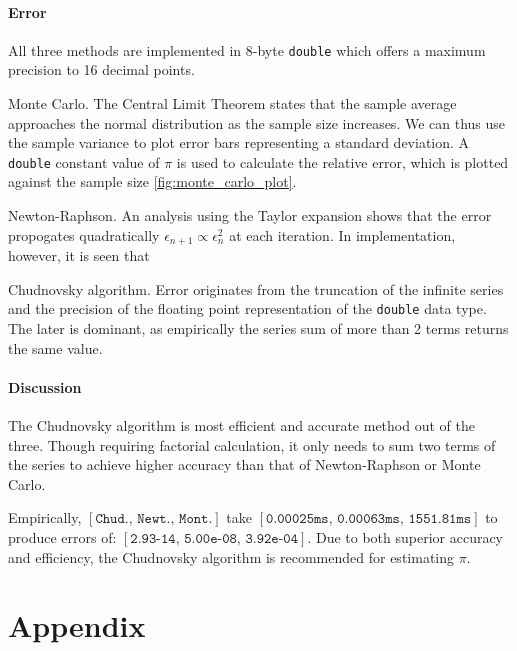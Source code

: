 \documentclass[11pt]{article}
\begin{document}
\paragraph{Error}
All three methods are implemented in 8-byte \texttt{double} which offers a maximum precision to
16 decimal points.
\par{Monte Carlo.} The Central Limit Theorem states that the sample average approaches the normal distribution as
the sample size increases. We can thus use the sample variance to plot error bars representing
a standard deviation. A \texttt{double} constant value of $\pi$ is used to calculate the relative error, which is
plotted against the sample size \ref{fig:monte_carlo_plot}.
\par{Newton-Raphson.} An analysis using the Taylor expansion shows that the error propogates quadratically $\epsilon_{n+1}\propto \epsilon_n^2$
at each iteration. In implementation, however, it is seen that 
\par{Chudnovsky algorithm.} Error originates from the truncation of the infinite series and the precision of the floating point 
representation of the \texttt{double} data type. The later is dominant, as empirically the series sum of more than 2 terms
returns the same value.

\paragraph{Discussion} The Chudnovsky algorithm is most efficient and accurate method out of the three. Though requiring 
factorial calculation, it only needs to sum two terms of the series to achieve
higher accuracy than that of Newton-Raphson or Monte Carlo.
\par Empirically, $[\texttt{Chud., Newt., Mont.}]$
take $[\texttt{0.00025ms, 0.00063ms, 1551.81ms}]$ to produce errors of: $[\texttt{2.93-14, 5.00e-08, 3.92e-04}]$.
Due to both superior accuracy and efficiency, the Chudnovsky algorithm is recommended for estimating $\pi$.
\newpage
\section*{Appendix}
\end{document}
